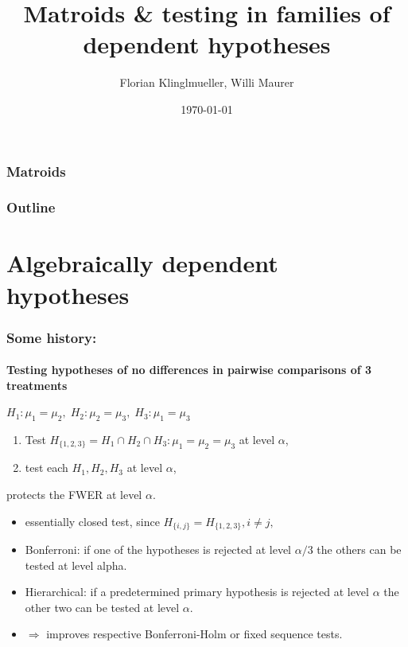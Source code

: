 \documentclass[bigger]{beamer}
\title{Matroids \& testing in families of dependent hypotheses}
\author{Florian Klinglmueller, Willi Maurer}
\date{\today}
\begin{document}
\frametitle{Matroids}

\maketitle



\begin{frame}
\frametitle{Outline}
\setcounter{tocdepth}{3}
\tableofcontents
\end{frame}




\section{Algebraically dependent hypotheses}


\begin{frame}
\frametitle{Some history:}
\framesubtitle{Testing hypotheses of no differences in pairwise
  comparisons of 3 treatments}


\begin{block}{$H_1:\mu_1=\mu_2,\; H_2:\mu_2=\mu_3,\;H_3:\mu_1=\mu_3$}
  \begin{enumerate}
  \item Test $H_ {\{1,2,3\}} = H_1\cap H_2 \cap H_3 :
    \mu_1=\mu_2=\mu_3$ at level $\alpha$,
  \item test each $H_1,H_2,H_3$ at level $\alpha$,
  \end{enumerate}
  protects the FWER at level $\alpha$.
\end{block}
\pause
  \begin{itemize}
    \item  essentially closed test, since %
        $H_{\{i,j\}} = H_{\{1,2,3\}}, i\neq j,$

    \item  Bonferroni: if one of the hypotheses is rejected at level $\alpha/3$ the others can be tested at level alpha.
    \item  Hierarchical: if a predetermined primary hypothesis is rejected at level $\alpha$ the other two can be tested at level $\alpha$.
    \item  $\Rightarrow$ improves respective Bonferroni-Holm or fixed sequence tests.
  \end{itemize}

\end{frame}
\end{document}
